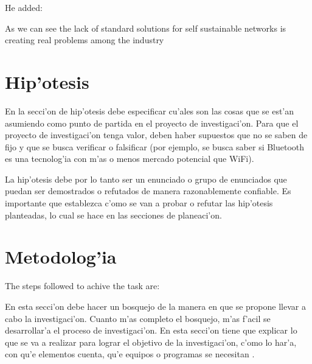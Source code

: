 He added: 


As we can see the lack of standard solutions for self sustainable networks is 
creating real problems among the industry

\section{Hip'otesis}
\noindent
En la secci'on de hip'otesis debe especificar cu'ales son las cosas que se 
est'an asumiendo como punto de partida en el proyecto de investigaci'on. Para 
que el proyecto de investigaci'on tenga valor, deben haber supuestos que no se 
saben de fijo y que se busca verificar o falsificar (por ejemplo, se busca saber 
si Bluetooth es una tecnolog'ia con m'as o menos mercado potencial que WiFi).

La hip'otesis debe por lo tanto ser un enunciado o grupo de enunciados que 
puedan ser demostrados o refutados de manera razonablemente confiable. Es 
importante que establezca c'omo se van a probar o refutar las hip'otesis 
planteadas, lo cual se hace en las secciones de planeaci'on.

\section{Metodolog'ia}
\noindent

The steps followed to achive the task are: 




En esta secci'on debe hacer un bosquejo de la manera en que se propone llevar a 
cabo la investigaci'on. Cuanto m'as completo el bosquejo, m'as f'acil se 
desarrollar'a el proceso de investigaci'on. En esta secci'on tiene que explicar 
lo que se va a realizar para lograr el objetivo de la investigaci'on, c'omo lo 
har'a, con qu'e elementos cuenta, qu'e equipos o programas se necesitan 
\cite{Demo:tesis_autor}.

\clearpage

